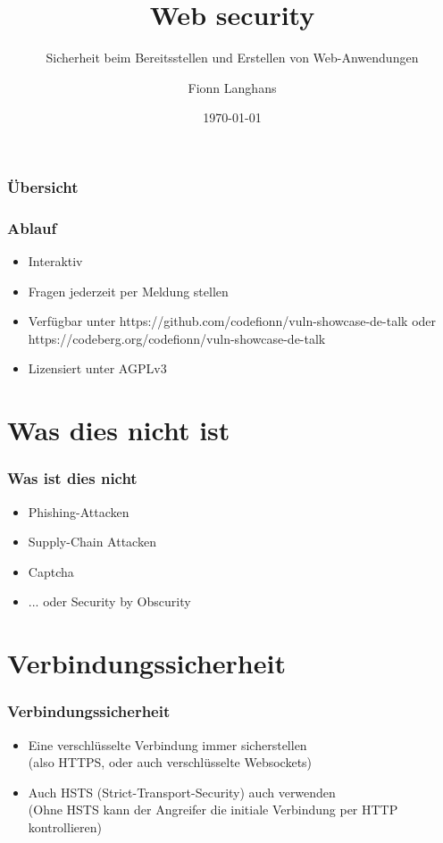 \documentclass[ngerman2]{beamer}
\title{Web security}
\subtitle{Sicherheit beim Bereitsstellen und Erstellen von Web-Anwendungen}
\author{Fionn Langhans}
\date{\today}
\begin{document}
\frame{\titlepage}

\begin{frame}
\frametitle{Übersicht}
  \tableofcontents
\end{frame}

\begin{frame}[fragile]
\frametitle{Ablauf}
  \begin{itemize}
		\item Interaktiv
		\item Fragen jederzeit per Meldung stellen
    \item Verfügbar unter https://github.com/codefionn/vuln-showcase-de-talk
      oder https://codeberg.org/codefionn/vuln-showcase-de-talk
    \item Lizensiert unter AGPLv3 \cite{agplv3}
  \end{itemize}
\end{frame}

\section{Was dies nicht ist}

\begin{frame}[fragile]
\frametitle{Was ist dies nicht}
  \begin{itemize}
		\item Phishing-Attacken
		\item Supply-Chain Attacken
    \item Captcha
    \item ... oder Security by Obscurity
  \end{itemize}
\end{frame}

\section{Verbindungssicherheit}

\begin{frame}[fragile]
\frametitle{Verbindungssicherheit}
  \begin{itemize}
		\item Eine verschlüsselte Verbindung immer sicherstellen\\
      (also HTTPS, oder auch verschlüsselte Websockets)
		\item Auch HSTS (Strict-Transport-Security) auch verwenden\\
			(Ohne HSTS kann der Angreifer die initiale Verbindung per HTTP kontrollieren)
  \end{itemize}
\end{frame}
\end{document}
